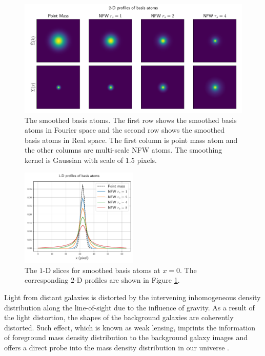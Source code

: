\documentclass[twocolumn]{aastex62}
\begin{document}
\begin{figure}[!t]
    \includegraphics[width=1.\textwidth]{nfwlet-atom-2D.pdf}
    \caption{The smoothed basis atoms. The first row shows the smoothed basis atoms in Fourier space 
            and the second row shows the smoothed basis atoms in Real space. 
            The first column is point mass atom and the other columns are multi-scale NFW atoms.
            The smoothing kernel is Gaussian with scale of $1.5$ pixels.} \label{fig-atoms2D}
\end{figure}

\begin{figure}
 \includegraphics[width=0.5\textwidth]{nfwlet-atom-1D.pdf}
 \caption{The $1$-D slices for smoothed basis atoms at $x=0$. The corresponding $2$-D profiles are shown in Figure 
        \ref{fig-atoms2D}.} \label{fig-atoms1D}
\end{figure}

Light from distant galaxies is distorted by the intervening inhomogeneous density distribution along the line-of-sight
due to the influence of gravity. As a result of the light distortion, the shapes of the background galaxies are coherently
distorted. Such effect, which is known as weak lensing, imprints the information of foreground mass density distribution
to the background galaxy images and offers a direct probe into the mass density distribution in our universe
\citep[see][for recent reviews]{revKilbinger15,revRachel17}.
\end{document}

